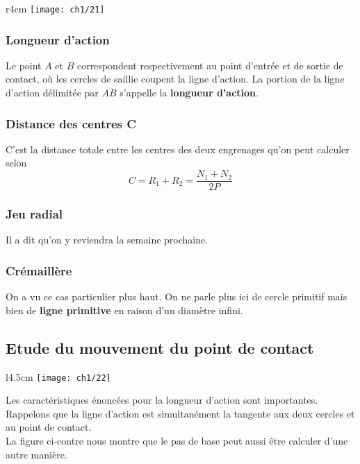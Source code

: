 \begin{wrapfigure}[4]{r}{4cm}
	\vspace{-5mm}
	\texttt{[image: ch1/21]}
\end{wrapfigure}				 
\subsubsection{Longueur d'action}
Le point $A$ et $B$ correspondent respectivement au point d'entrée et de sortie de contact, où les cercles de saillie coupent la ligne d'action. La portion de la ligne d'action délimitée par $AB$ s'appelle la \textbf{longueur d'action}.
		
\subsubsection{Distance des centres C}
C'est la distance totale entre les centres des deux engrenages qu'on peut calculer selon
\begin{equation}
	C = R_1 + R_2 = \frac{N_1 + N_2}{2P}
\end{equation}
		
\subsubsection{Jeu radial}
Il a dit qu'on y reviendra la semaine prochaine. 
		
		
\subsubsection{Crémaillère}
On a vu ce cas particulier plus haut. On ne parle plus ici de cercle primitif mais bien de \textbf{ligne primitive} en raison d'un diamètre infini. 
		
\subsection{Etude du mouvement du point de contact}		
\begin{wrapfigure}[7]{l}{4.5cm}
	\vspace{-5mm}
	\texttt{[image: ch1/22]}
\end{wrapfigure}				 
Les caractéristiques énoncées pour la longueur d'action sont importantes. Rappelons que la ligne d'action est simultanément la tangente aux deux cercles et au point de contact. \\
La figure ci-contre nous montre que le pas de base peut aussi être calculer d'une autre manière.\\
	
